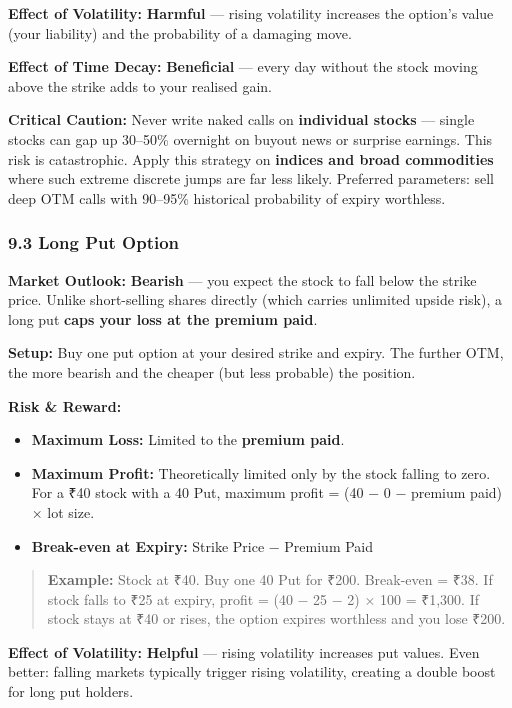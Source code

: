 \documentclass[12pt,openany]{book}
\begin{document}
\textbf{Effect of Volatility:} \textbf{Harmful} — rising volatility increases the option's value (your liability) and the probability of a damaging move.

\textbf{Effect of Time Decay:} \textbf{Beneficial} — every day without the stock moving above the strike adds to your realised gain.

\textbf{Critical Caution:} Never write naked calls on \textbf{individual stocks} — single stocks can gap up 30–50\% overnight on buyout news or surprise earnings. This risk is catastrophic. Apply this strategy on \textbf{indices and broad commodities} where such extreme discrete jumps are far less likely. Preferred parameters: sell deep OTM calls with 90–95\% historical probability of expiry worthless.


\subsubsection{9.3 Long Put Option}

\textbf{Market Outlook:} \textbf{Bearish} — you expect the stock to fall below the strike price. Unlike short-selling shares directly (which carries unlimited upside risk), a long put \textbf{caps your loss at the premium paid}.

\textbf{Setup:} Buy one put option at your desired strike and expiry. The further OTM, the more bearish and the cheaper (but less probable) the position.

\textbf{Risk \& Reward:}
\begin{itemize}[leftmargin=*]
    \item \textbf{Maximum Loss:} Limited to the \textbf{premium paid}.
    \item \textbf{Maximum Profit:} Theoretically limited only by the stock falling to zero. For a ₹40 stock with a 40 Put, maximum profit = (40 − 0 − premium paid) × lot size.
    \item \textbf{Break-even at Expiry:} Strike Price − Premium Paid
\end{itemize}

\begin{quote}
\textbf{Example:} Stock at ₹40. Buy one 40 Put for ₹200. Break-even = ₹38. If stock falls to ₹25 at expiry, profit = (40 − 25 − 2) × 100 = ₹1,300. If stock stays at ₹40 or rises, the option expires worthless and you lose ₹200.
\end{quote}

\textbf{Effect of Volatility:} \textbf{Helpful} — rising volatility increases put values. Even better: falling markets typically trigger rising volatility, creating a double boost for long put holders.
\end{document}
